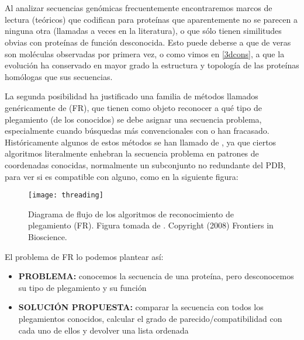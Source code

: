 \section{} \label{FRsection}

Al analizar secuencias gen\'{o}micas frecuentemente encontraremos marcos de lectura (te\'{o}ricos) que codifican para prote\'{i}nas que aparentemente no se parecen a ninguna otra (llamadas a veces  en la literatura), 
o que s\'{o}lo tienen similitudes obvias con prote\'{i}nas de funci\'{o}n desconocida. Esto puede deberse a que de veras son 
mol\'{e}culas observadas por primera vez, o como vimos en \ref{3dcons}, a que la evoluci\'{o}n ha conservado en mayor grado
la estructura y topolog\'{i}a de las prote\'{i}nas hom\'{o}logas que sus secuencias. 

La segunda posibilidad ha justificado una familia de m\'{e}todos llamados gen\'{e}ricamente de  (FR), 
que tienen como objeto reconocer a qu\'{e} tipo de plegamiento (de los conocidos) se debe asignar una secuencia problema, 
especialmente cuando b\'{u}squedas m\'{a}s convencionales con 
 o 
han fracasado.
Hist\'{o}ricamente algunos de estos m\'{e}todos se han llamado de
, 
ya que ciertos algoritmos 
literalmente enhebran la secuencia problema en patrones de coordenadas conocidas, normalmente un subconjunto no redundante
del PDB, para ver si es compatible con alguno, como en la siguiente figura:

\begin{figure}
\begin{center} 
\texttt{[image: threading]}
\caption%
{
Diagrama de flujo de los algoritmos de reconocimiento de plegamiento (FR).
Figura tomada de \cite{Guo2008}. Copyright (2008) Frontiers in Bioscience. 
}
\label{fig:threading}
\end{center}
\end{figure}

El problema de FR lo podemos plantear as\'{i}:
\begin{itemize}
\item \textbf{PROBLEMA:} conocemos la secuencia de una prote\'{i}na, pero desconocemos su tipo de plegamiento y su funci\'{o}n
\item \textbf{SOLUCI\'{O}N PROPUESTA:} comparar la secuencia con todos los plegamientos conocidos, calcular el grado de parecido/compatibilidad con cada uno de ellos y devolver una lista ordenada
\end{itemize}

